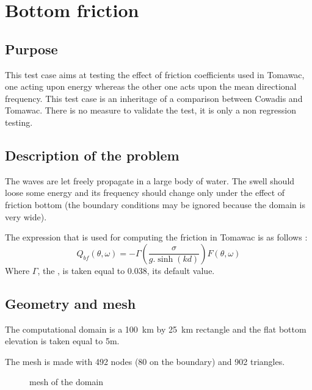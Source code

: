 \chapter{Bottom friction}
%

%
\section{Purpose}
%
This test case aims at testing the effect of friction coefficients used in Tomawac, one acting upon energy whereas the other one acts upon the mean directional frequency. This test case is an inheritage of a comparison between Cowadis and Tomawac. There is no measure to validate the test, it is only a non regression testing.



%
\section{Description of the problem}
The waves are let freely propagate in a large body of water. The swell should loose some energy and its frequency should change only under the effect of friction bottom (the boundary conditions may be ignored because the domain is very wide).

The expression that is used for computing the friction in Tomawac is as follows :
\begin{equation}
Q_{bf}(\theta,\omega)=-\Gamma \left(\frac{\sigma}{g.\sinh(kd)}\right)F(\theta,\omega)
\end{equation}
Where $\Gamma$, the , is taken equal to 0.038, its default value.

\section{Geometry and mesh}
The computational domain is a 100~km by 25~km rectangle and the flat bottom elevation is taken equal to 5m.

The mesh is made with 492 nodes (80 on the boundary) and 902 triangles.

\begin{figure} [!h]
\centering
{}
 \caption{mesh of the domain}\label{mailbf}
\end{figure}

